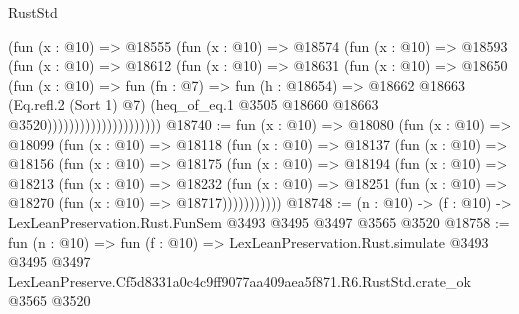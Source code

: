 \begin{lexlean}{RustStd}
\begin{coremodule}
                              (fun (x : @10) =>
                              @18555
                                (fun (x : @10) =>
                                @18574
                                  (fun (x : @10) =>
                                  @18593
                                    (fun (x : @10) =>
                                    @18612
                                      (fun (x : @10) =>
                                      @18631
                                        (fun (x : @10) =>
                                        @18650
                                          (fun (x : @10) =>
                                          fun (fn : @7) =>
                                          fun (h : @18654) =>
                                          @18662
                                            @18663
                                            (Eq.refl.{2} (Sort 1) @7)
                                            (heq_of_eq.{1}
                                              @3505
                                              @18660
                                              @18663
                                              @3520)))))))))))))))))))))
@18740 := fun (x : @10) =>
  @18080
    (fun (x : @10) =>
    @18099
      (fun (x : @10) =>
      @18118
        (fun (x : @10) =>
        @18137
          (fun (x : @10) =>
          @18156
            (fun (x : @10) =>
            @18175
              (fun (x : @10) =>
              @18194
                (fun (x : @10) =>
                @18213
                  (fun (x : @10) =>
                  @18232
                    (fun (x : @10) =>
                    @18251 (fun (x : @10) => @18270 (fun (x : @10) => @18717)))))))))))
@18748 := (n : @10) -> (f : @10) -> LexLeanPreservation.Rust.FunSem @3493 @3495 @3497 @3565 @3520
@18758 := fun (n : @10) =>
  fun (f : @10) =>
  LexLeanPreservation.Rust.simulate
    @3493
    @3495
    @3497
    LexLeanPreserve.Cf5d8331a0c4c9ff9077aa409aea5f871.R6.RustStd.crate_ok
    @3565
    @3520
\end{coremodule}
\end{lexlean}

